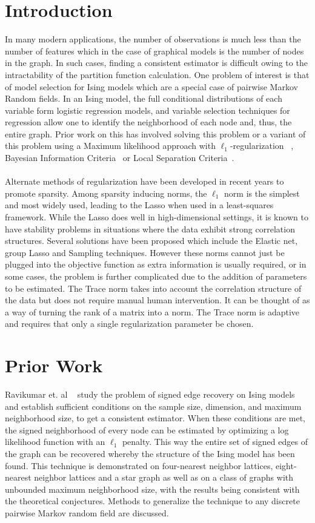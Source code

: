 \documentclass[11pt]{article}
\begin{document}
\section{Introduction}
In many modern applications, the number of observations is much less than the number of features which in the case of graphical models is the number of nodes in the graph. In such cases, finding a consistent estimator is difficult owing to the intractability of the partition function calculation. One problem of interest is that of model selection for Ising models which are a special case of pairwise Markov Random fields. In an Ising model, the full conditional distributions of each variable form logistic regression models, and variable selection techniques for regression allow one to identify the neighborhood of each node and, thus, the entire graph. Prior work on this has involved solving this problem or a variant of this problem using a Maximum likelihood approach with $\ell_1$-regularization ~\cite{ravikumar2010high}, Bayesian Information Criteria~\cite{barber2015high} or Local Separation Criteria~\cite{anandkumar2012high}. \\ \\
Alternate methods of regularization have been developed in recent years to promote sparsity. Among sparsity inducing norms, the $\ell_1$ norm is the simplest and most widely used, leading to the Lasso when used in a least-squares framework. While the Lasso does well in high-dimensional settings, it is known to have stability problems in situations where the data exhibit strong correlation structures. Several solutions have been proposed which include the Elastic net, group Lasso and Sampling techniques. However these norms cannot just be plugged into the objective function as extra information is usually required, or in some cases, the problem is further complicated due to the addition of parameters to be estimated. The Trace norm takes into account the correlation structure of the data but does not require manual human intervention. It can be thought of as a way of turning the rank of a matrix into a norm. The Trace norm is adaptive and requires that only a single regularization parameter be chosen. 	

\section{Prior Work}
Ravikumar et. al ~\cite{ravikumar2010high} study the problem of signed edge recovery on Ising models and establish sufficient conditions on the sample size, dimension, and maximum neighborhood size, to get a consistent estimator. When these conditions are met, the signed neighborhood of every node can be estimated by optimizing a log likelihood function with an $\ell_1$ penalty. This way the entire set of signed edges of the graph can be recovered whereby the structure of the Ising model has been found. This technique is demonstrated on four-nearest neighbor lattices, eight-nearest neighbor lattices and a star graph as well as on a class of graphs with unbounded maximum neighborhood size, with the results being consistent with the theoretical conjectures. Methods to generalize the technique to any discrete pairwise Markov random field are discussed.
\end{document}
